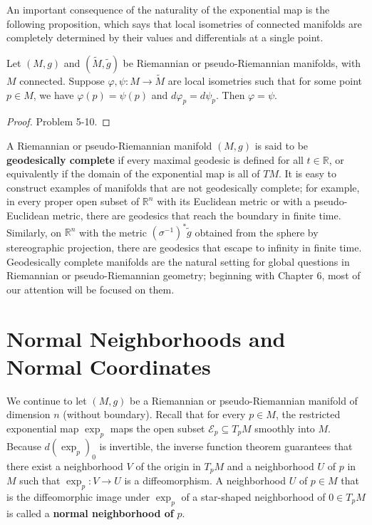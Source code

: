 An important consequence of the naturality of the exponential map is the following proposition, which says that local isometries of connected manifolds are completely determined by their values and differentials at a single point.

\begin{proposition}
\label{prop:local-isometries-completely-determined}

Let $(M, g)$ and $(\tilde{M}, \tilde{g})$ be Riemannian or pseudo-Riemannian manifolds, with $M$ connected. Suppose $\varphi, \psi: M \to \tilde{M}$ are local isometries such that for some point $p \in M$, we have $\varphi(p) = \psi(p)$ and $d\varphi_p = d\psi_p$. Then $\varphi = \psi$.

\begin{proof}
Problem 5-10.
\end{proof}
\end{proposition}

A Riemannian or pseudo-Riemannian manifold $(M, g)$ is said to be \textbf{geodesically complete} if every maximal geodesic is defined for all $t \in \mathbb{R}$, or equivalently if the domain of the exponential map is all of $TM$. It is easy to construct examples of manifolds that are not geodesically complete; for example, in every proper open subset of $\mathbb{R}^n$ with its Euclidean metric or with a pseudo-Euclidean metric, there are geodesics that reach the boundary in finite time. Similarly, on $\mathbb{R}^n$ with the metric $(\sigma^{-1})^*\tilde{g}$ obtained from the sphere by stereographic projection, there are geodesics that escape to infinity in finite time. Geodesically complete manifolds are the natural setting for global questions in Riemannian or pseudo-Riemannian geometry; beginning with Chapter 6, most of our attention will be focused on them.

\section{Normal Neighborhoods and Normal Coordinates}

We continue to let $(M, g)$ be a Riemannian or pseudo-Riemannian manifold of dimension $n$ (without boundary). Recall that for every $p \in M$, the restricted exponential map $\exp_p$ maps the open subset $\mathcal{E}_p \subseteq T_p M$ smoothly into $M$. Because $d(\exp_p)_0$ is invertible, the inverse function theorem guarantees that there exist a neighborhood $V$ of the origin in $T_p M$ and a neighborhood $U$ of $p$ in $M$ such that $\exp_p: V \to U$ is a diffeomorphism. A neighborhood $U$ of $p \in M$ that is the diffeomorphic image under $\exp_p$ of a star-shaped neighborhood of $0 \in T_p M$ is called a \textbf{normal neighborhood of } $p$.

